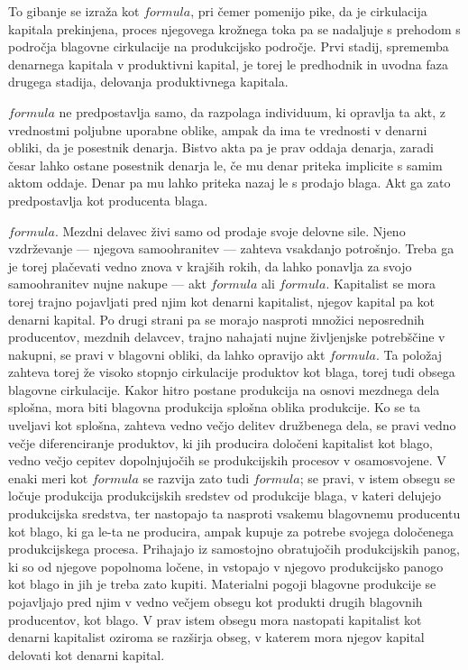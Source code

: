 \documentclass[kapital_02.tex]{subfiles}
\begin{document}
To gibanje se izraža kot \( formula \), pri čemer pomenijo pike, da je cirkulacija kapitala prekinjena, proces njegovega krožnega toka pa se nadaljuje s prehodom s področja blagovne cirkulacije na produkcijsko področje. Prvi stadij, sprememba denarnega kapitala v produktivni kapital, je torej le predhodnik in uvodna faza drugega stadija, delovanja produktivnega kapitala.

\( formula \) ne predpostavlja samo, da razpolaga individuum, ki opravlja ta akt, z vrednostmi poljubne uporabne oblike, ampak da ima te vrednosti v denarni obliki, da je posestnik denarja. Bistvo akta pa je prav oddaja denarja, zaradi česar lahko ostane posestnik denarja le, če mu denar priteka implicite s samim aktom oddaje. Denar pa mu lahko priteka nazaj le s prodajo blaga. Akt ga zato predpostavlja kot producenta blaga.

\( formula \). Mezdni delavec živi samo od prodaje svoje delovne sile. Njeno vzdrževanje --- njegova samoohranitev --- zahteva vsakdanjo potrošnjo. Treba ga je torej plačevati vedno znova v krajših rokih, da lahko ponavlja za svojo samoohranitev nujne nakupe --- akt \( formula \) ali \( formula \). Kapitalist se mora torej trajno pojavljati pred njim kot denarni kapitalist, njegov kapital pa kot denarni kapital. Po drugi strani pa se morajo nasproti množici neposrednih producentov, mezdnih delavcev, trajno nahajati nujne življenjske potrebščine v nakupni, se pravi v blagovni obliki, da lahko opravijo akt \( formula \). Ta položaj zahteva torej že visoko stopnjo cirkulacije produktov kot blaga, torej tudi obsega blagovne cirkulacije. Kakor hitro postane produkcija na osnovi mezdnega dela splošna, mora biti blagovna produkcija splošna oblika produkcije. Ko se ta uveljavi kot splošna, zahteva vedno večjo delitev družbenega dela, se pravi vedno večje diferenciranje produktov, ki jih producira določeni kapitalist kot blago, vedno večjo cepitev dopolnjujočih se produkcijskih procesov v osamosvojene. V enaki meri kot \( formula \) se razvija zato tudi \( formula \); se pravi, v istem obsegu se ločuje produkcija produkcijskih sredstev od produkcije blaga, v kateri delujejo produkcijska sredstva, ter nastopajo ta nasproti vsakemu blagovnemu producentu kot blago, ki ga le-ta ne producira, ampak kupuje za potrebe svojega določenega produkcijskega procesa. Prihajajo iz samostojno obratujočih produkcijskih panog, ki so od njegove popolnoma ločene, in vstopajo v njegovo produkcijsko panogo kot blago in jih je treba zato kupiti. Materialni pogoji blagovne produkcije se pojavljajo pred njim v vedno večjem obsegu kot produkti drugih blagovnih producentov, kot blago. V prav istem obsegu mora nastopati kapitalist kot denarni kapitalist oziroma se razširja obseg, v katerem mora njegov kapital delovati kot denarni kapital.
\end{document}
